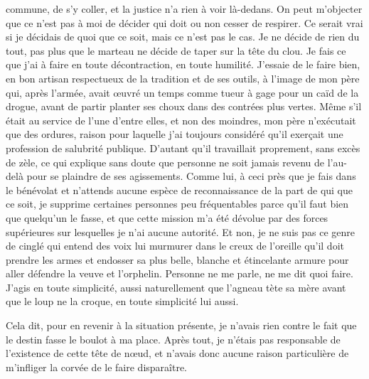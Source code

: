 commune, de s’y coller, et la justice n’a rien à voir là-dedans. On peut m’objecter que ce n’est pas à moi de décider qui doit ou non cesser de respirer. Ce serait vrai si je décidais de quoi que ce soit, mais ce n’est pas le cas. Je ne décide de rien du tout, pas plus que le marteau ne décide de taper sur la tête du clou. Je fais ce que j’ai à faire en toute décontraction, en toute humilité. J’essaie de le faire bien, en bon artisan respectueux de la tradition et de ses outils, à l’image de mon père qui, après l’armée, avait œuvré un temps comme tueur à gage pour un caïd de la drogue, avant de partir planter ses choux dans des contrées plus vertes. Même s’il était au service de l’une d’entre elles, et non des moindres, mon père n’exécutait que des ordures, raison pour laquelle j’ai toujours considéré qu’il exerçait une profession de salubrité publique. D’autant qu’il travaillait proprement, sans excès de zèle, ce qui explique sans doute que personne ne soit jamais revenu de l’au-delà pour se plaindre de ses agissements. Comme lui, à ceci près que je fais dans le bénévolat et n’attends aucune espèce de reconnaissance de la part de qui que ce soit, je supprime certaines personnes peu fréquentables parce qu’il faut bien que quelqu’un le fasse, et que cette mission m’a été dévolue par des forces supérieures sur lesquelles je n’ai aucune autorité. Et non, je ne suis pas ce genre de cinglé qui entend des voix lui murmurer dans le creux de l’oreille qu’il doit prendre les armes et endosser sa plus belle, blanche et étincelante armure pour aller défendre la veuve et l’orphelin. Personne ne me parle, ne me dit quoi faire. J’agis en toute simplicité, aussi naturellement que l’agneau tète sa mère avant que le loup ne la croque, en toute simplicité lui aussi.

Cela dit, pour en revenir à la situation présente, je n’avais rien contre le fait que le destin fasse le boulot à ma place. Après tout, je n’étais pas responsable de l’existence de cette tête de nœud, et n’avais donc aucune raison particulière de m’infliger la corvée de le faire disparaître.

\illusloflabel{}%


\scene

